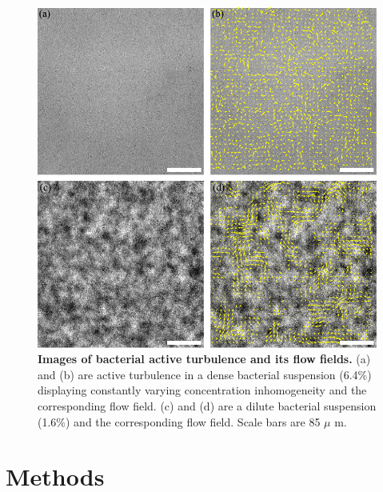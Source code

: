\begin{figure}[htbp]
\begin{center}
\includegraphics[width=5.5in]{figs/5-GNF/1.pdf}
\caption[Images of bacterial active turbulence and its flow fields]
{
\textbf{Images of bacterial active turbulence and its flow fields.}
(a) and (b) are active turbulence in a dense bacterial suspension (6.4\%) displaying constantly varying concentration inhomogeneity and the corresponding flow field.
(c) and (d) are a dilute bacterial suspension (1.6\%) and the corresponding flow field.
Scale bars are 85 $\mu$ m.
}
\label{fig:experiment}
\end{center}
\end{figure}


\section{Methods}

